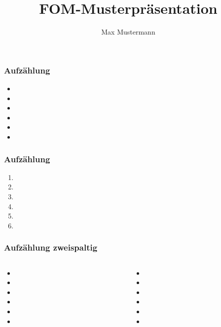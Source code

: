 \documentclass[12pt,ngerman]{beamer}
\author{Max Mustermann}
\title{FOM-Musterpräsentation}
\begin{document}
\begin{frame}

\maketitle

\end{frame}

\begin{frame}
\frametitle{Aufzählung}

\begin{itemize}
\item 
\item 
\item 
\item 
\item 
\item 
\end{itemize}

\end{frame}


\begin{frame}
\frametitle{Aufzählung}

\begin{enumerate}
\item 
\item 
\item 
\item 
\item 
\item 
\end{enumerate}

\end{frame}

\begin{frame}
\frametitle{Aufzählung zweispaltig}

\begin{columns}
\begin{column}{0.5\textwidth}
\begin{itemize}
\item 
\item 
\item 
\item 
\item 
\item 
\end{itemize}
\end{column}
\begin{column}{0.5\textwidth}
\begin{itemize}
\item 
\item 
\item 
\item 
\item 
\item 
\end{itemize}
\end{column}
\end{columns}

\end{frame}
\end{document}
